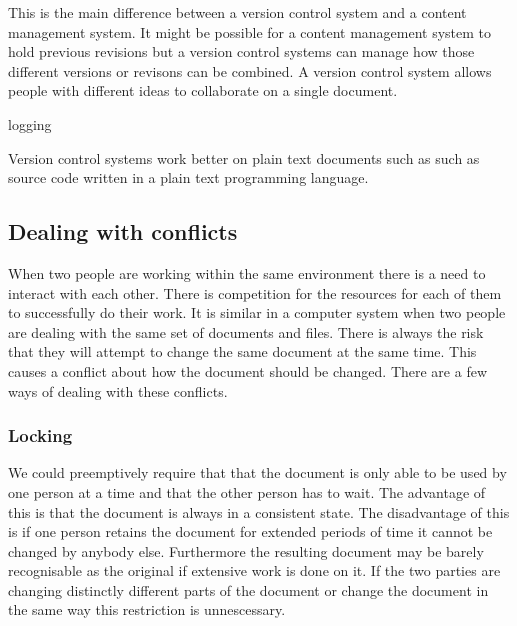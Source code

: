 This is the main difference between a version control system and a content management system.  It might be possible for a content management system to hold previous revisions but  a version control systems can manage how those different versions or revisons can be combined.  A version control system allows people with different ideas to collaborate on a single document.

logging


Version control systems work better on plain text documents such as such as source code written in a plain text programming language.

\subsection{Dealing with conflicts}
When two people are working within the same environment there is a need to interact with each other.
There is competition for the resources for each of them to successfully do their work.
It is similar in a computer system when two people are dealing with the same set of documents and files.
There is always the risk that they will attempt to change the same document at the same time.
This causes a conflict about how the document should be changed.
There are a few ways of dealing with these conflicts.

\subsubsection{Locking}
We could preemptively require that that the document is only able to be used by one person at a time and that the other person has to wait. The advantage of this is that the document is always in a consistent state. The disadvantage of this is if one person retains the document for extended periods of time it cannot be changed by anybody else. Furthermore the resulting document may be barely recognisable as the original if extensive work is done on it. If the two parties are changing distinctly different parts of the document or change the document in the same way this restriction is unnescessary.


